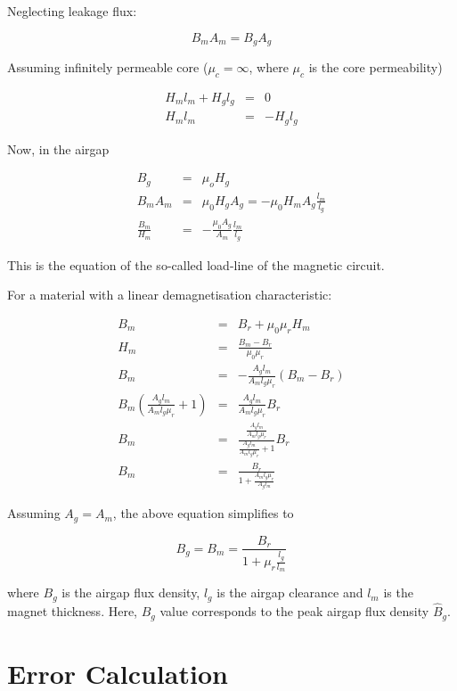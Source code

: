 \documentclass[a4paper, 11pt, titlepage]{article}
\begin{document}
Neglecting leakage flux:

\begin{equation}
	B_mA_m = B_gA_g
\end{equation}

Assuming infinitely permeable core ($\mu_c=\infty$, where $\mu_c$ is the core permeability)

\begin{eqnarray}
	H_ml_m + H_gl_g &=& 0 \\
	H_ml_m &=& -H_gl_g
\end{eqnarray}

Now, in the airgap

\begin{eqnarray}
	B_g &=& \mu_oH_g \\
	B_mA_m &=& \mu_0H_gA_g=-\mu_0H_mA_g\frac{l_m}{l_g} \\
	\frac{B_m}{H_m} &=& -\frac{\mu_0A_g}{A_m}\frac{l_m}{l_g}
	\label{label:loadLine}
\end{eqnarray}

This is the equation of the so-called load-line of the magnetic circuit. 

For a material with a linear demagnetisation characteristic:

\begin{eqnarray}
	B_m &=& B_r + \mu_0\mu_rH_m \\
	H_m &=& \frac{B_m-B_r}{\mu_0\mu_r} \\
	B_m &=& -\frac{A_gl_m}{A_ml_g\mu_r}(B_m-B_r) \\
	B_m(\frac{A_gl_m}{A_ml_g\mu_r}+1) &=& \frac{A_gl_m}{A_ml_g\mu_r}B_r \\
	B_m &=& \frac{\frac{A_gl_m}{A_ml_g\mu_r}}{\frac{A_gl_m}{A_ml_g\mu_r}+1}B_r \\
	B_m &=& \frac{B_r}{1+\frac{A_ml_g\mu_r}{A_gl_m}}
	\label{label:demagnetizationCharacteristics}
\end{eqnarray}

Assuming $A_g = A_m$, the above equation simplifies to

\begin{equation}
	B_g = B_m = \frac{B_r}{1+\mu_r\frac{l_g}{l_m}}
\end{equation}

where $B_g$ is the airgap flux density, $l_g$ is the airgap clearance and $l_m$ is the magnet thickness. Here, $B_g$ value corresponds to the peak airgap flux density $\hat{B}_g$. 


\section{Error Calculation}
\label{app:errorCalculation}
\end{document}
